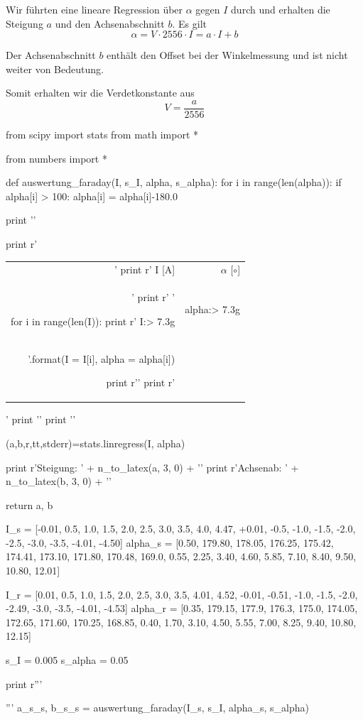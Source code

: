 Wir führten eine lineare Regression über $\alpha$ gegen $I$ durch und erhalten die Steigung $a$ und den Achsenabschnitt $b$. Es gilt
$$ \alpha = V \cdot 2556 \cdot  I = a \cdot I + b $$

Der Achsenabschnitt $b$ enthält den Offset bei der Winkelmessung und ist nicht weiter von Bedeutung.

Somit erhalten wir die Verdetkonstante aus $$ V = \frac{a}{2556} $$  


\newcommand{\faradayDesc}{}

\begin{python}
from scipy import stats
from math import *

from numbers import *

def auswertung_faraday(I, s_I, alpha, s_alpha):
  for i in range(len(alpha)):
    if alpha[i] > 100:
      alpha[i] = alpha[i]-180.0

  print '\n'

  print r'\begin{tabular}{rr} \toprule'
  print r' I [A] & $\alpha$ [$\circ$] \\'
  print r' \midrule '

  for i in range(len(I)):
    print r' {I:> 7.3g}  &  {alpha:> 7.3g} \\ '.format(I = I[i], alpha = alpha[i])

  print r'\bottomrule '
  print r'\end{tabular}'
  print '\n'
  print '\n'

  (a,b,r,tt,stderr)=stats.linregress(I, alpha)

  print r'Steigung: ' + n_to_latex(a, 3, 0) + '\n'
  print r'Achsenab: ' + n_to_latex(b, 3, 0) + '\n'

  return a, b


I_s = [-0.01, 0.5, 1.0, 1.5, 2.0, 2.5, 3.0, 3.5, 4.0, 4.47, +0.01, -0.5, -1.0, -1.5, -2.0, -2.5, -3.0, -3.5, -4.01, -4.50]
alpha_s = [0.50, 179.80, 178.05, 176.25, 175.42, 174.41, 173.10, 171.80, 170.48, 169.0, 0.55, 2.25, 3.40, 4.60, 5.85, 7.10, 8.40, 9.50, 10.80, 12.01]

I_r = [0.01, 0.5, 1.0, 1.5, 2.0, 2.5, 3.0, 3.5, 4.01, 4.52, -0.01, -0.51, -1.0, -1.5, -2.0, -2.49, -3.0, -3.5, -4.01, -4.53]
alpha_r = [0.35, 179.15, 177.9, 176.3, 175.0, 174.05, 172.65, 171.60, 170.25, 168.85, 0.40, 1.70, 3.10, 4.50, 5.55, 7.00, 8.25, 9.40, 10.80, 12.15]

s_I = 0.005
s_alpha = 0.05


print r'''\begin{table}[H]
\begin{minipage}[b]{0.5\linewidth}
\centering
         '''
a_s_s, b_s_s = auswertung_faraday(I_s, s_I, alpha_s, s_alpha)


\end{minipage}
\end{table}
\end{python}
